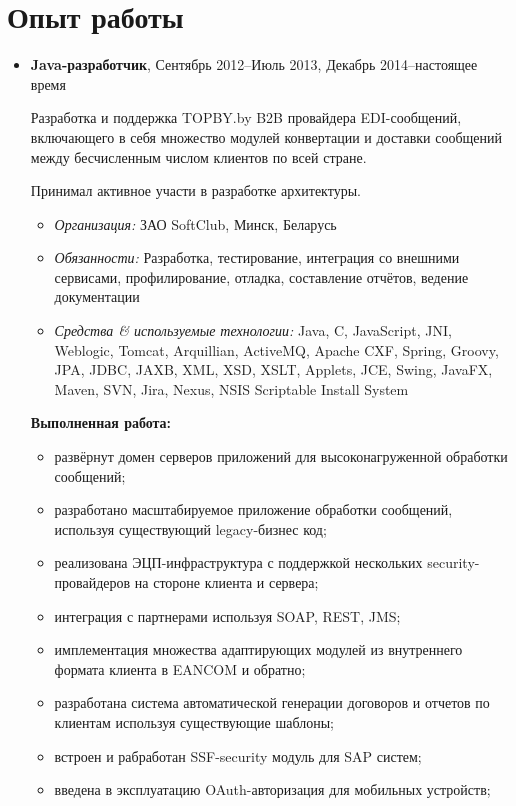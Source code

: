 \documentclass[a4paper, 12pt]{article}
\newcommand{\position}[1]{
    \textbf{#1}}
\newcommand{\itemlabel}[1]{
    \textit{#1:}}
\begin{document}
\section*{Опыт работы}

    \begin{itemize}
        \item \position{Java-разработчик}, Сентябрь 2012--Июль 2013, Декабрь 2014--настоящее время

            Разработка и поддержка TOPBY.by B2B провайдера EDI-сообщений, включающего в себя множество модулей конвертации и доставки сообщений  между бесчисленным числом клиентов по всей стране.

            Принимал активное участи в разработке архитектуры.
            	
            \begin{itemize}
                \item \itemlabel{Организация} ЗАО SoftClub, Минск, Беларусь
                \item \itemlabel{Обязанности} Разработка, тестирование, интеграция со внешними сервисами, 
                \newline профилирование, отладка, составление отчётов, ведение документации
                \item \itemlabel{Средства \& используемые технологии} Java, C, JavaScript, JNI, Weblogic, Tomcat, Arquillian, ActiveMQ, Apache CXF, Spring, Groovy, JPA, JDBC, JAXB, XML, XSD, XSLT, Applets, JCE, Swing, JavaFX, Maven, SVN, Jira, Nexus, NSIS Scriptable Install System
            \end{itemize}
            
            \textbf{Выполненная работа:}
			\begin{itemize}
  				\item развёрнут домен серверов приложений для высоконагруженной обработки сообщений;
  				\item разработано масштабируемое приложение обработки сообщений, используя существующий legacy-бизнес код;
				\item реализована ЭЦП-инфраструктура с поддержкой нескольких security-провайдеров на стороне клиента и сервера;
  				\item интеграция с партнерами используя SOAP, REST, JMS;
  				\item имплементация множества адаптирующих модулей из внутреннего формата клиента в EANCOM и обратно;
  				\item разработана система автоматической генерации договоров и отчетов по клиентам используя существующие шаблоны;
  				\item встроен и рабработан SSF-security модуль для SAP систем;
  				\item введена в эксплуатацию OAuth-авторизация для мобильных устройств;
			\end{itemize}
            

\end{itemize}
\end{document}
